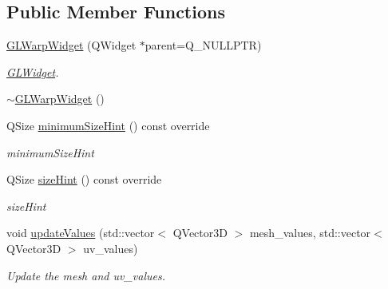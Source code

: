 \subsection*{Public Member Functions}
\begin{DoxyCompactItemize}
\item 
\mbox{\hyperlink{class_g_l_warp_widget_a5b2cdeb05b78d1acb1f13e59a691a001}{G\+L\+Warp\+Widget}} (Q\+Widget $\ast$parent=Q\+\_\+\+N\+U\+L\+L\+P\+TR)
\begin{DoxyCompactList}\small\item\em \mbox{\hyperlink{class_g_l_widget}{G\+L\+Widget}}. \end{DoxyCompactList}\item 
\mbox{\hyperlink{class_g_l_warp_widget_a38b3a090564985953d31003630985361}{$\sim$\+G\+L\+Warp\+Widget}} ()
\item 
Q\+Size \mbox{\hyperlink{class_g_l_warp_widget_aee1b83d5cce73680d18b10432834dbcc}{minimum\+Size\+Hint}} () const override
\begin{DoxyCompactList}\small\item\em minimum\+Size\+Hint \end{DoxyCompactList}\item 
Q\+Size \mbox{\hyperlink{class_g_l_warp_widget_ab48f61235afc35cfac013edb34445c57}{size\+Hint}} () const override
\begin{DoxyCompactList}\small\item\em size\+Hint \end{DoxyCompactList}\item 
void \mbox{\hyperlink{class_g_l_warp_widget_ac7619517a9aa914452fa39092242b3b3}{update\+Values}} (std\+::vector$<$ Q\+Vector3D $>$ mesh\+\_\+values, std\+::vector$<$ Q\+Vector3D $>$ uv\+\_\+values)
\begin{DoxyCompactList}\small\item\em Update the mesh and uv\+\_\+values. \end{DoxyCompactList}\end{DoxyCompactItemize}
